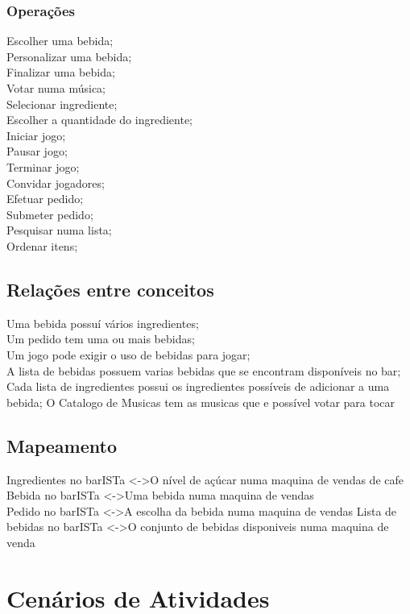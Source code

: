 \documentclass{article}
\begin{document}
\subsubsection*{Operações}
Escolher uma bebida;\\
Personalizar uma bebida;\\
Finalizar uma bebida;\\
Votar numa música;\\
Selecionar ingrediente;\\
Escolher a quantidade do ingrediente;\\
Iniciar jogo;\\
Pausar jogo;\\
Terminar jogo;\\
Convidar jogadores;\\
Efetuar pedido;\\
Submeter pedido;\\
Pesquisar numa lista;\\
Ordenar itens;\\

\subsection*{Relações entre conceitos}
Uma bebida possuí vários ingredientes;\\
Um pedido tem uma ou mais bebidas;\\
Um jogo pode exigir o uso de bebidas para jogar;\\
A lista de bebidas possuem varias bebidas que se encontram disponíveis no bar;
Cada lista de ingredientes possui os ingredientes possíveis de adicionar a uma bebida;
O Catalogo de Musicas tem as musicas que e possível votar para tocar



\subsection*{Mapeamento}
Ingredientes no barISTa \textless -\textgreater O nível de açúcar numa maquina de vendas de cafe\\
Bebida no barISTa \textless -\textgreater   Uma bebida numa maquina de vendas\\
Pedido no barISTa \textless -\textgreater  A escolha da bebida numa maquina de vendas
Lista de bebidas no barISTa \textless -\textgreater O conjunto de bebidas disponiveis numa maquina de venda\\


\section*{Cenários de Atividades}
\end{document}
